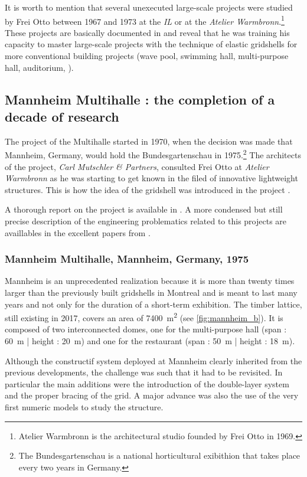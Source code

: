 It is worth to mention that several unexecuted large-scale projects were studied by Frei Otto between 1967 and 1973 at the \emph{IL} or at the \emph{Atelier Warmbronn}.\footnote{Atelier Warmbronn is the architectural studio founded by Frei Otto in 1969.} These projects are basically documented in \cite[pp.~278 - 288]{IL10} and reveal that he was training his capacity to master large-scale projects with the technique of elastic gridshells for more conventional building projects (wave pool, swimming hall, multi-purpose hall, auditorium, \telp{}).

\subsection{Mannheim Multihalle : the completion of a decade of research}
The project of the Multihalle started in 1970, when the decision was made that Mannheim, Germany, would hold the Bundesgartenschau in 1975.\footnote{The Bundesgartenschau is a national horticultural exibithion that takes place every two years in Germany.} The architects of the project, \emph{Carl Mutschler \& Partners}, consulted Frei Otto at \emph{Atelier Warmbronn} as he was starting to get known in the filed of innovative lightweight structures. This is how the idea of the gridshell was introduced in the project \cite{Liddell2015}. 

A thorough report on the project is available in \cite{IL13}.  A more condensed but still precise description of the engineering problematics related to this projects are availlables in the excellent papers from \citet{Happold1975, Liddell2015}.

\subsubsection{Mannheim Multihalle, Mannheim, Germany, 1975}
Mannheim is an unprecedented realization because it is more than twenty times larger than the previously built gridshells in Montreal and is meant to last many years and not only for the duration of a short-term exhibition. The timber lattice, still existing in 2017,  covers an area of \SI{7400}{m^2} (see \cref{fig:mannheim_b}). It is composed of two interconnected domes, one for the multi-purpose hall (span : \SI{60}{m} | height : \SI{20}{m}) and one for the restaurant (span : \SI{50}{m} | height : \SI{18}{m}).

Although the constructif system deployed at Mannheim clearly inherited from the previous developments, the challenge was such that it had to be revisited. In particular the main additions were the introduction of the double-layer system and the proper bracing of the grid. A major advance was also the use of the very first numeric models to study the structure. 

